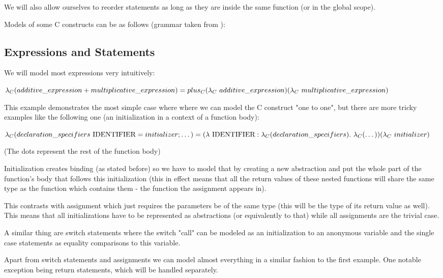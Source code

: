 We will also allow ourselves to reorder statements as long as they are inside the same function (or in the global scope).

Models of some C constructs can be as follows (grammar taken from ): %

\subsection{Expressions and Statements}

We will model most expressions very intuitively:

$\lambda_C(additive\_expression + multiplicative\_expression) = \\ plus_C (\lambda_C\ additive\_expression) (\lambda_C\ multiplicative\_expression)$

This example demonstrates the most simple case where where we can model the C construct "one to one", but there are more tricky examples like the following one (an initialization in a context of a function body):

$\lambda_C(declaration\_specifiers\ \text{IDENTIFIER} = initializer; \dots) = \\ (\lambda\ \text{IDENTIFIER} : \lambda_C(declaration\_specifiers) .\ \lambda_C(\dots)) (\lambda_C\ initializer)$

(The dots represent the rest of the function body)

Initialization creates binding (as stated before) so we have to model that by creating a new abstraction and put the whole part of the function's body that follows this initialization (this in effect means that all the return values of these nested functions will share the same type as the function which contains them - the function the assignment appears in).

This contrasts with assignment which just requires the parameters be of the same type (this will be the type of its return value as well). This means that all initializations have to be represented as abstractions (or equivalently to that) while all assignments are the trivial case.

A similar thing are switch statements where the switch "call" can be modeled as an initialization to an anonymous variable and the single case statements as equality comparisons to this variable.

Apart from switch statements and assignments we can model almost everything in a similar fashion to the first example. One notable exception being return statements, which will be handled separately.

